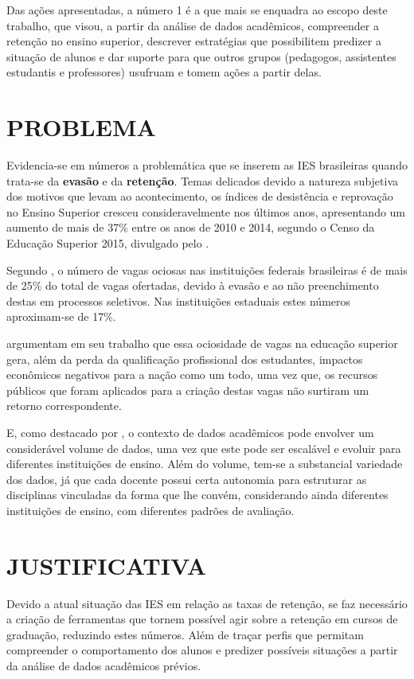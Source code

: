 Das ações apresentadas, a número 1 é a que mais se enquadra ao escopo deste trabalho, que visou, a partir da análise de dados acadêmicos, compreender a retenção no ensino superior, descrever estratégias que possibilitem predizer a situação de alunos e dar suporte para que outros grupos (pedagogos, assistentes estudantis e professores) usufruam e tomem ações a partir delas. 

\section{PROBLEMA}
\label{sec:problema}

Evidencia-se em números a problemática que se inserem as IES brasileiras quando trata-se da \textbf{evasão} e da \textbf{retenção}. Temas delicados devido a natureza subjetiva dos motivos que levam ao acontecimento, os índices de desistência e reprovação no Ensino Superior cresceu consideravelmente nos últimos anos, apresentando um aumento de mais de 37\% entre os anos de 2010 e 2014, segundo o Censo da Educação Superior 2015, divulgado pelo . 

Segundo , o número de vagas ociosas nas instituições federais brasileiras é de mais de 25\% do total de vagas ofertadas, devido à evasão e ao não preenchimento destas em processos seletivos. Nas instituições estaduais estes números aproximam-se de 17\%.

 argumentam em seu trabalho que essa ociosidade de vagas na educação superior gera, além da perda da qualificação profissional dos estudantes, impactos econômicos negativos para a nação como um todo, uma vez que, os recursos públicos que foram aplicados para a criação destas vagas não surtiram um retorno correspondente.

E, como destacado por , o contexto de dados acadêmicos pode envolver um considerável volume de dados, uma vez que este pode ser escalável e evoluir para diferentes instituições de ensino.
Além do volume, tem-se a substancial variedade dos dados, já que cada docente possui certa autonomia para estruturar as disciplinas vinculadas da forma que lhe convém, considerando ainda diferentes instituições de ensino, com diferentes padrões de avaliação.

\section{JUSTIFICATIVA}
\label{sec:justificativa}
Devido a atual situação das IES em relação as taxas de retenção, se faz necessário a criação de ferramentas que tornem possível agir sobre a retenção em cursos de graduação, reduzindo estes números. Além de traçar perfis que permitam compreender o comportamento dos alunos e predizer possíveis situações a partir da análise de dados acadêmicos prévios. 

